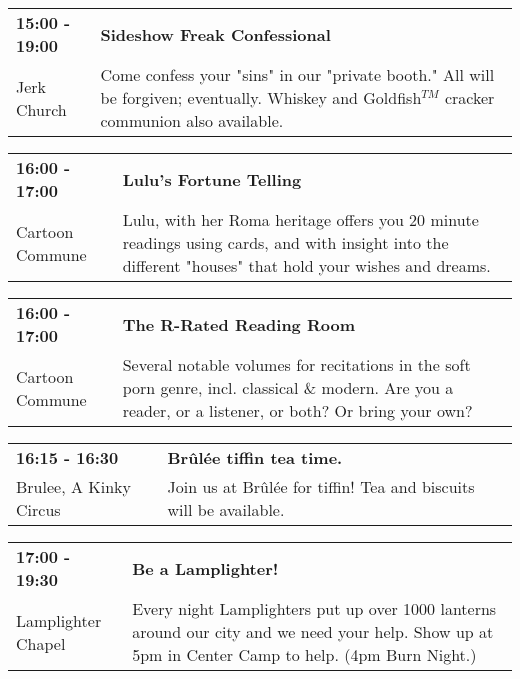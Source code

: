\begin{tabular}{ p{1in} p{2.2in} }
    \textbf{15:00 - 19:00} & \textbf{Sideshow Freak Confessional} \\
    Jerk Church \newline  & Come confess your "sins" in our "private booth." All will be forgiven; eventually. Whiskey and Goldfish$^{TM}$ cracker communion also available. \\
    \hline 
\end{tabular}
    
\begin{tabular}{ p{1in} p{2.2in} }
    \textbf{16:00 - 17:00} & \textbf{Lulu's Fortune Telling} \\
    Cartoon Commune \newline  & Lulu, with her Roma heritage offers you 20 minute readings using cards, and with insight into the different "houses" that hold your wishes and dreams. \\
    \hline 
\end{tabular}
    
\begin{tabular}{ p{1in} p{2.2in} }
    \textbf{16:00 - 17:00} & \textbf{The R-Rated Reading Room} \\
    Cartoon Commune \newline  & Several notable volumes for recitations in the soft porn genre, incl. classical \& modern. Are you a reader, or a listener, or both? Or bring your own? \\
    \hline 
\end{tabular}
    
\begin{tabular}{ p{1in} p{2.2in} }
    \textbf{16:15 - 16:30} & \textbf{Br\^ul\'ee tiffin tea time.} \\
    Brulee, A Kinky Circus \newline  & Join us at Br\^ul\'ee for tiffin! Tea and biscuits will be available. \\
    \hline 
\end{tabular}
    
\begin{tabular}{ p{1in} p{2.2in} }
    \textbf{17:00 - 19:30} & \textbf{Be a Lamplighter!} \\
    Lamplighter Chapel \newline  & Every night Lamplighters put up over 1000 lanterns around our city and we need your help. Show up at 5pm in Center Camp to help. (4pm Burn Night.) \\
    \hline 
\end{tabular}
    

